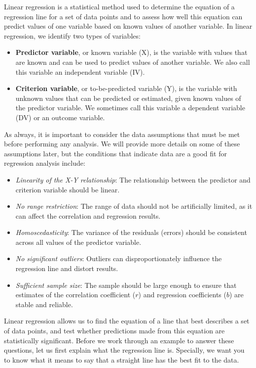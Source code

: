 \documentclass[
  letterpaper,
  DIV=11,
  numbers=noendperiod]{scrreprt}
\begin{document}
Linear regression is a statistical method used to determine the equation
of a regression line for a set of data points and to assess how well
this equation can predict values of one variable based on known values
of another variable. In linear regression, we identify two types of
variables:

\begin{itemize}
\item
  \textbf{Predictor variable}, or known variable (X), is the variable
  with values that are known and can be used to predict values of
  another variable. We also call this variable an independent variable
  (IV).\,\,
\item
  \textbf{Criterion variable}, or to-be-predicted variable (Y), is the
  variable with unknown values that can be predicted or estimated, given
  known values of the predictor variable. We sometimes call this
  variable a dependent variable (DV) or an outcome variable.\,\, \,
\end{itemize}

As always, it is important to consider the data assumptions that must be
met before performing any analysis. We will provide more details on some
of these assumptions later, but the conditions that indicate data are a
good fit for regression analysis include:\,\,

\begin{itemize}
\item
  \emph{Linearity of the X-Y relationship}: The relationship between the
  predictor and criterion variable should be linear.
\item
  \emph{No range restriction}: The range of data should not be
  artificially limited, as it can affect the correlation and regression
  results.
\item
  \emph{Homoscedasticity}: The variance of the residuals (errors) should
  be consistent across all values of the predictor variable.
\item
  \emph{No significant outliers}: Outliers can disproportionately
  influence the regression line and distort results.
\item
  \emph{Sufficient sample size}: The sample should be large enough to
  ensure that estimates of the correlation coefficient (\(r\)) and
  regression coefficients (\(b\)) are stable and reliable.
\end{itemize}

Linear regression allows us to find the equation of a line that best
describes a set of data points, and test whether predictions made from
this equation are statistically significant. Before we work through an
example to answer these questions, let us first explain what the
regression line is. Specially, we want you to know what it means to say
that a straight line has the best fit to the data.
\end{document}
